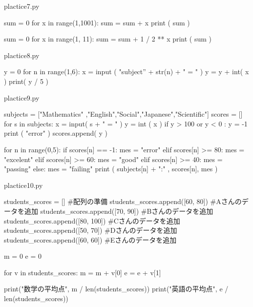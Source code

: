 \documentclass[11pt,a4paper,dvipdfmx,titlepage]{jsreport}
\begin{document}
\begin{ansbox}{plactice7.py}
\begin{listing}{1}
sum = 0
for x in range(1,1001):
    sum = sum + x
print ( sum ) 

sum = 0
for x in range(1, 11):
    sum = sum + 1 / 2 ** x
print ( sum )
\end{listing}
\end{ansbox}

\begin{ansbox}{plactice8.py}
\begin{listing}{1}
y = 0
for n in range(1,6):
    x = input ( "subject” + str(n) + " = " )
    y = y + int( x )
print( y / 5 )
\end{listing}
\end{ansbox}

\begin{ansbox}{plactice9.py}
\begin{listing}{1}
subjects = ["Mathematics" ,"English","Social","Japanese","Scientific"]
scores = []
for s in subjects:
    x = input( s + " = " )
    y = int ( x )
    if y > 100 or y < 0 :
        y = -1
        print ( "error" )
    scores.append( y )

for n in range(0,5):
    if scores[n] == -1:
        mes = "error"
    elif scores[n] >= 80:
        mes = "excelent"
    elif scores[n] >= 60:
        mes = "good"
    elif scores[n] >= 40:
        mes = "passing"
    else:
        mes = "failing"
    print ( subjects[n] + ":" , scores[n], mes )
\end{listing}
\end{ansbox}

\begin{ansbox}{plactice10.py}
\begin{listing}{1}
students_scores = []
#配列の準備
students_scores.append([60, 80]) #Aさんのデータを追加
students_scores.append([70, 90]) #Bさんのデータを追加
students_scores.append([80, 100]) #Cさんのデータを追加
students_scores.append([50, 70]) #Dさんのデータを追加
students_scores.append([60, 60]) #Eさんのデータを追加

m = 0
e = 0

for v in students_scores:
    m = m + v[0]
    e = e + v[1]

print("数学の平均点", m / len(students_scores))
print("英語の平均点", e / len(students_scores))
\end{listing}
\end{ansbox}
\end{document}
